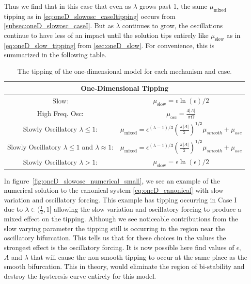 Thus we find that in this case that even as $\lambda$ grows past 1, the same $\mu_{\text{mixed}}$ tipping as in \eqref{eq:oneD_slowosc_caseItipping} occurs from \autoref{subsec:oneD_slowosc_caseI}. But as $\lambda$ continues to grow, the oscillations continue to have less of an impact until the solution tips entirely like $\mu_{\text{slow}}$ as in \eqref{eq:oneD_slow_tipping} from \autoref{sec:oneD_slow}. For convenience, this is summarized in the following table.

\begin{table}[H]\label{table:oneD_tipping}
\centering
\begin{tabular}{|c|c|}
\hline 
 \multicolumn{2}{|c|}{One-Dimensional Tipping} \\ 
\hline
Slow: & $\mu_{\text{slow}}=\epsilon\ln(\epsilon)/2$ \\ 
\hline 
High Freq. Osc: & $\mu_{\text{osc}}=\frac{4|A|}{\pi \Omega}$\\ 
\hline 
Slowly Oscillatory $\lambda\le 1$: & $\mu_{\text{mixed}}=\epsilon^{(\lambda-1)/3}\left(\frac{\pi |A|}{2}\right)^{1/3} \mu_{smooth}+\mu_{osc}$ \\ 
\hline 
Slowly Oscillatory $\lambda\le 1$ and $\lambda\approx 1$: & $\mu_{\text{mixed}}=\epsilon^{(\lambda-1)/3}\left(\frac{\pi |A|}{2}\right)^{1/3} \mu_{smooth}+\mu_{osc}$ \\
\hline
Slowly Oscillatory $\lambda>1$: & $ \mu_{\text{slow}}=\epsilon\ln(\epsilon)/2$\\
\hline
\end{tabular} 
\caption{The tipping of the one-dimensional model for each mechanism and case.}
\end{table}

In figure~\ref{fig:oneD_slowosc_numerical_small}, we see an example of the numerical solution to the canonical system \eqref{eq:oneD_canonical} with slow variation and oscillatory forcing. This example has tipping occurring in Case I due to $\lambda\in (\frac{1}{2},1]$ allowing the slow variation and oscillatory forcing to produce a mixed effect on the tipping. Although we see noticeable contributions from the slow varying parameter the tipping still is occurring in the region near the oscillatory bifurcation. This tells us that for these choices in the values the strongest effect is the oscillatory forcing. It is now possible here find values of $\epsilon$, $A$ and $\lambda$ that will cause the non-smooth tipping to occur at the same place as the smooth bifurcation. This in theory, would eliminate the region of bi-stability and destroy the hysteresis curve entirely for this model.

